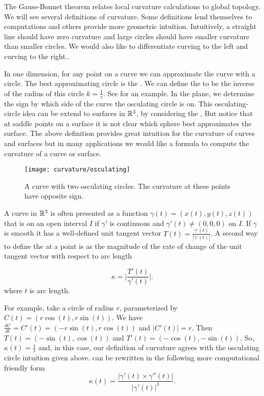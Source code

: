 
The Gauss-Bonnet theorem relates local curvature calculations
to global topology. 
We will see several definitions of curvature.
Some definitions lend themselves to computations and others provide
more geometric intuition.
Intuitively, a straight line should have zero curvature and
 large circles should have smaller curvature than smaller circles.
 We would also like to differentiate
curving to the left and curving to the right..

In one dimension, for any point on a curve
we can approximate the curve with a circle.
The best approximating circle is the  .
 We can define the  to be the inverse of the radius of this circle $k=\frac{1}{r}$.
See  for an example.
In the plane, we determine the sign by which side of the curve the osculating circle is on.
 This osculating-circle idea can be extend
to  surfaces in $\mathbb{R}^3$, by considering the ,
But notice that at saddle points on a surface it is not clear which sphere
best approximates the surface.
The above definition provides great intuition for the curvature of curves
and surfaces but in many applications we would like a formula to compute
the curvature of a curve or surface.


\begin{figure}[htb]
	\centering
	\texttt{[image: curvature/osculating]}
	\caption{A curve with two osculating circles. The curvature at these points
	have opposite sign.}
	\label{fig:osculating-circle}
\end{figure}

A curve in $\mathbb{R}^3$ is often presented as a function
$\gamma(t)=(x(t),y(t),z(t))$ that  is  on an open interval $I$
if $\gamma'$ is continuous and $\gamma'(t)\neq (0,0,0)$ on $I$. 
If $\gamma$ is smooth it has a well-defined unit tangent vector $T(t)=\frac{\gamma'(t)}{|\gamma'(t)|}.$
A second way to define the   at a point is as the magnitude of the rate of change of the unit tangent vector with respect to arc length

\begin{equation} \label{eqn:kappa}
\kappa=\bigg  | \frac{T'(t)}{\gamma'(t)}\bigg |.
\end{equation}
where $t$ is arc length.

For example, take a circle of radius $r$, parameterized by $C(t)=\left(r\cos(t),r\sin(t)\right)$.
We have $\frac{dC}{dt}=C'(t)=\left(-r\sin(t),r\cos(t)\right)$ and $|C'(t)|=r$.
Then $T(t)=\left(-\sin(t),\cos(t)\right)$ and $T'(t)=\left(-\cos(t),-\sin(t)\right)$.
So, $\kappa(t)=\frac{1}{r}$ and, in this case, our definition of curvature agrees with the
osculating circle intuition given above. 
 can be rewritten in the following more computational friendly form 
\begin{equation} \label{eqn:kappa1}
\kappa(t)=\frac{|\gamma'(t)\times \gamma''(t)|}{|\gamma'(t)|^3}.
\end{equation}

